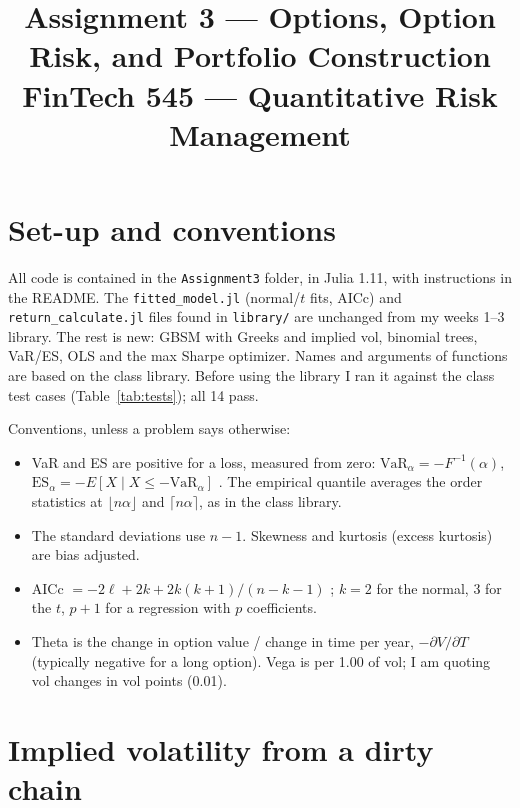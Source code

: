 \documentclass[11pt]{article}
\title{Assignment 3 --- Options, Option Risk, and Portfolio Construction\\[0.3em]
\large FinTech 545 --- Quantitative Risk Management}
\author{} %
\date{}
\newcommand{\tbl}[1]{}
\begin{document}
\maketitle

\section*{Set-up and conventions}

All code is contained in the \texttt{Assignment3} folder, in Julia 1.11, with instructions in the README. The \texttt{fitted\_model.jl} (normal/$t$ fits, AICc) and \texttt{return\_calculate.jl} files found in \texttt{library/} are unchanged from my weeks 1--3 library. The rest is new: GBSM with Greeks and implied vol, binomial trees, VaR/ES, OLS and the max Sharpe optimizer. Names and arguments of functions are based on the class library. Before using the library I ran it against the class test cases (Table~\ref{tab:tests}); all 14 pass.

\begin{table}[H]
\centering\small
\caption{Library checked against the class test cases.}
\label{tab:tests}
\tbl{tests}
\end{table}

Conventions, unless a problem says otherwise:
\begin{itemize}\setlength\itemsep{0.1em}
\item VaR and ES are positive for a loss, measured from zero: $\mathrm{VaR}_\alpha=-F^{-1}(\alpha)$, $\mathrm{ES}_\alpha=-E[X\mid X\le-\mathrm{VaR}_\alpha]$ \citep[Weeks 04--05]{pazzula2026notes}. The empirical quantile averages the order statistics at $\lfloor n\alpha\rfloor$ and $\lceil n\alpha\rceil$, as in the class library.
\item The standard deviations use $n-1$. Skewness and kurtosis (excess kurtosis) are bias adjusted.
\item AICc $=-2\ell+2k+2k(k+1)/(n-k-1)$ \citep{hurvich1989regression}; $k=2$ for the normal, 3 for the $t$, $p+1$ for a regression with $p$ coefficients.
\item Theta is the change in option value / change in time per year, $-\partial V/\partial T$ (typically negative for a long option). Vega is per 1.00 of vol; I am quoting vol changes in vol points (0.01).
\end{itemize}

\section{Implied volatility from a dirty chain}
\end{document}
